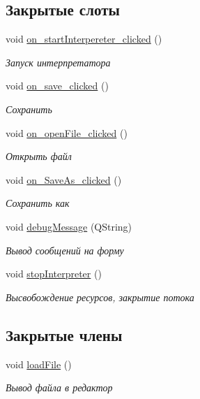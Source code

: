 \subsection*{Закрытые слоты}
\begin{DoxyCompactItemize}
\item 
void \hyperlink{class_main_window_a4b11549301823f52f40c90715cc70ec5}{on\+\_\+start\+Interpereter\+\_\+clicked} ()
\begin{DoxyCompactList}\small\item\em Запуск интерпретатора \end{DoxyCompactList}\item 
void \hyperlink{class_main_window_a06fb14e8cace4221ee7a721c961934ce}{on\+\_\+save\+\_\+clicked} ()
\begin{DoxyCompactList}\small\item\em Сохранить \end{DoxyCompactList}\item 
void \hyperlink{class_main_window_ad157e69c40c80314586029f2a7c5e549}{on\+\_\+open\+File\+\_\+clicked} ()
\begin{DoxyCompactList}\small\item\em Открыть файл \end{DoxyCompactList}\item 
void \hyperlink{class_main_window_a55dfc7c049679ca635f6f629d5401d56}{on\+\_\+\+Save\+As\+\_\+clicked} ()
\begin{DoxyCompactList}\small\item\em Сохранить как \end{DoxyCompactList}\item 
void \hyperlink{class_main_window_ac29732293ed85bb092764df7b93fefbc}{debug\+Message} (Q\+String)
\begin{DoxyCompactList}\small\item\em Вывод сообщений на форму \end{DoxyCompactList}\item 
void \hyperlink{class_main_window_a123b5275e6bb8411973a2f2be7b8b45f}{stop\+Interpreter} ()
\begin{DoxyCompactList}\small\item\em Высвобождение ресурсов, закрытие потока \end{DoxyCompactList}\end{DoxyCompactItemize}
\subsection*{Закрытые члены}
\begin{DoxyCompactItemize}
\item 
void \hyperlink{class_main_window_abc114bfc2f3b523486d89887e7877aea}{load\+File} ()
\begin{DoxyCompactList}\small\item\em Вывод файла в редактор \end{DoxyCompactList}\end{DoxyCompactItemize}
